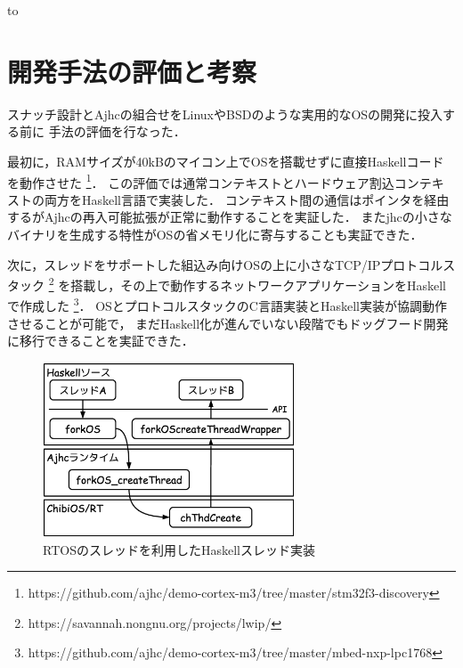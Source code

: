 \documentclass[submit,techreq,noauthor]{ipsj}
\begin{document}
\begin{table}[tb]
\caption{``hoge''と印字するプログラムに見るコンパイラの特性}
\label{tab:compilerlist}
\hbox to
\end{table}

\section{開発手法の評価と考察}

スナッチ設計とAjhcの組合せをLinuxやBSDのような実用的なOSの開発に投入する前に
手法の評価を行なった．

最初に，RAMサイズが40kBのマイコン上でOSを搭載せずに直接Haskellコードを動作させた
\footnote{https://github.com/ajhc/demo-cortex-m3/tree/master/stm32f3-discovery}．
この評価では通常コンテキストとハードウェア割込コンテキストの両方をHaskell言語で実装した．
コンテキスト間の通信はポインタを経由するがAjhcの再入可能拡張が正常に動作することを実証した．
またjhcの小さなバイナリを生成する特性がOSの省メモリ化に寄与することも実証できた．

次に，スレッドをサポートした組込み向けOSの上に小さなTCP/IPプロトコルスタック
\footnote{https://savannah.nongnu.org/projects/lwip/}
を搭載し，その上で動作するネットワークアプリケーションをHaskellで作成した
\footnote{https://github.com/ajhc/demo-cortex-m3/tree/master/mbed-nxp-lpc1768}．
OSとプロトコルスタックのC言語実装とHaskell実装が協調動作させることが可能で，
まだHaskell化が進んでいない段階でもドッグフード開発に移行できることを実証できた．

\begin{figure}[h]
\centering
\includegraphics[width=75mm]{draw/chibi_thr.eps}
\caption{RTOSのスレッドを利用したHaskellスレッド実装}
\label{fig:forkos}
\end{figure}
\end{document}
